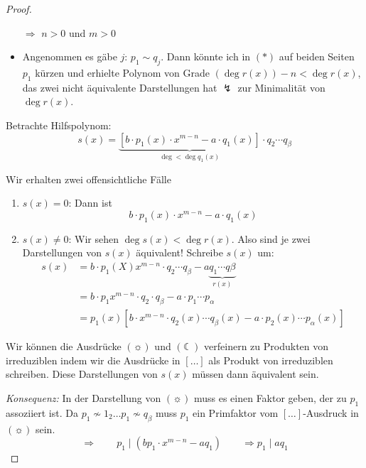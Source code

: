\documentclass[12pt,parskip=full]{scrartcl}
\theoremstyle{definition}
\theoremstyle{remark}
\begin{document}
\begin{proof}
\begin{itemize}
			$\Rightarrow$ $n > 0$ und $m > 0$
			
			\item Angenommen es gäbe $j$: $p_1 \sim q_j$. Dann könnte ich in $(*)$ auf beiden Seiten $p_1$ kürzen und erhielte Polynom von Grade $(\deg r(x)) - n < \deg r(x)$, das zwei nicht äquivalente Darstellungen hat $\lightning$ zur Minimalität von $\deg r(x)$.
		\end{itemize}
	
		Betrachte Hilfspolynom:
		\begin{equation*}
			s(x) = \underbrace{\left[ b \cdot p_1(x) \cdot x^{m-n} - a \cdot q_1(x) \right]}_{\deg < \deg q_1(x)} \cdot q_2 \cdots q_\beta \tag{\sun}
		\end{equation*}
		
		Wir erhalten zwei offensichtliche Fälle
		\begin{enumerate}
			\item $s(x) = 0$: Dann ist
			\begin{equation*}
				b \cdot p_1(x) \cdot x^{m-n} - a \cdot q_1(x)
			\end{equation*}
			\item $s(x) \neq 0$: Wir sehen $\deg s(x) < \deg r(x)$. Also sind je zwei Darstellungen von $s(x)$ äquivalent! Schreibe $s(x)$ um:
			\begin{align*}
				s(x) &= b \cdot p_1(X) x^{m-n} \cdot q_2 \cdots q_\beta - a \underbrace{q_1 \cdots q\beta}_{r(x)} \\
				&= b \cdot p_1 x ^{m-n} \cdot q_2 \cdot q_\beta - a \cdot p_1 \cdots p_\alpha \\
				&= p_1(x) \left[ b \cdot x^{m-n} \cdot q_2(x) \cdots q_\beta(x) - a \cdot p_2(x) \cdots p_\alpha(x) \right] \tag{\leftmoon}
			\end{align*}
		\end{enumerate}
	
		Wir können die Ausdrücke $(\sun)$ und $(\leftmoon)$ verfeinern zu Produkten von irreduziblen indem wir die Ausdrücke in $[\dots]$ als Produkt von irreduziblen schreiben. Diese Darstellungen von $s(x)$ müssen dann äquivalent sein.
		
		\textit{Konsequenz:} In der Darstellung von $(\sun)$ muss es einen Faktor geben, der zu $p_1$ assoziiert ist. Da $p_1 \nsim 1_2 \dots p_1 \nsim q_\beta$ muss $p_1$ ein Primfaktor vom $[\dots]$-Ausdruck in $(\sun)$ sein.
		\begin{equation*}
			\Rightarrow \qquad p_1 \mid (b p_1 \cdot x^{m-n} - a q_1) \qquad \Rightarrow p_1 \mid a q_1
		\end{equation*}
		

\end{proof}
\end{document}
